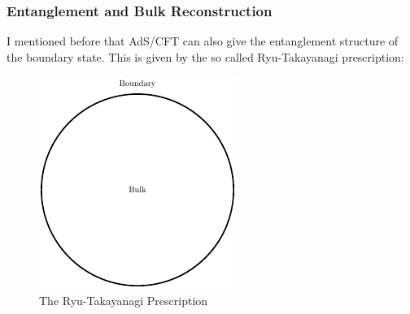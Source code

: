 \documentclass[8pt,aspectratio=169]{beamer}
\begin{document}
\begin{frame}
\frametitle{Entanglement and Bulk Reconstruction}

I mentioned before that AdS/CFT can also give the entanglement structure of the boundary state. This is given by the so called Ryu-Takayanagi prescription: 

\begin{minipage}[t]{0.55\linewidth}

\end{minipage}\hfill
%
\begin{minipage}[t]{0.44\linewidth}

\begin{figure}
    \begin{center}
    
        \includegraphics[scale=1]{RT0}    
    
    \end{center}
    \caption{The Ryu-Takayanagi Prescription}
    \label{fig:WDW}
\end{figure}

\end{minipage}

\end{frame}
\end{document}
